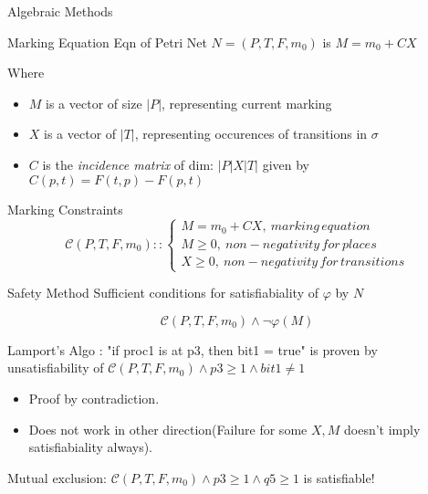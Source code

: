 \documentclass{beamer}
\begin{document}
\begin{frame}{Algebraic Methods}
  \begin{block}{Marking Equation}
Eqn of Petri Net $N= (P,T,F,m_0)$  is  $M = m_0+CX$
\end{block}
  Where \begin{itemize} 
  \item $M$ is a vector of size $|P|$, representing current marking
  \item $X$ is a vector of $|T|$, representing occurences of transitions in $\sigma$
  \item $C$ is the \textit{incidence matrix} of dim: $|P|X|T|$ given by \\
                    $C(p,t) = F(t,p) - F(p,t)$
  \end{itemize}

\begin{block}{Marking Constraints}
 $$ \mathcal{C}(P,T,F,m_0) :: \begin{cases}
  M = m_0 + CX, \:marking\, equation\\
  M \geq 0  ,\:non-negativity\,for\,places\\
  X \geq 0 ,\:non-negativity\,for\,transitions
 \end{cases}
 $$
\end{block}

\end{frame}

\begin{frame}{Safety Method}
  Sufficient conditions for satisfiabiality of $\varphi$ by $N$
  \begin{block}{}
    $$\mathcal{C}(P,T,F,m_0) \land \neg\varphi(M) $$
  \end{block}
\begin{example}
  Lamport's Algo : "if proc1 is at p3, then bit1 = true" is proven by\\ unsatisfiability of 
    $\mathcal{C}(P,T,F,m_0) \land p3 \geq 1 \land bit1 \neq 1$ 
\end{example}
  \begin{itemize}
  \item Proof by contradiction.

  \item Does not work in other direction(Failure for some $X,M$ doesn't imply satisfiabiality always).
  \end{itemize}
\begin{example}
 Mutual exclusion: $\mathcal{C}(P,T,F,m_0)\land p3 \geq 1 \land q5 \geq 1 $ is satisfiable!
\end{example}


\end{frame}
\end{document}
